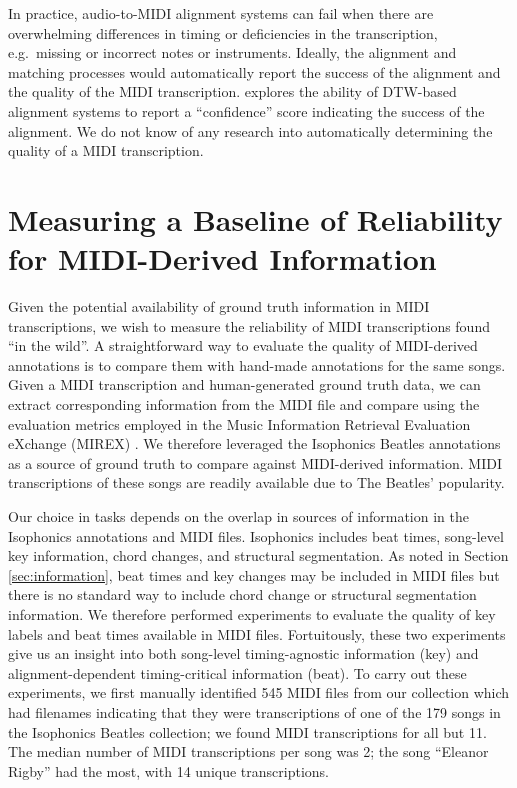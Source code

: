 \documentclass{article}
\begin{document}
In practice, audio-to-MIDI alignment systems can fail when there are overwhelming differences in timing or deficiencies in the transcription, e.g.\ missing or incorrect notes or instruments.
Ideally, the alignment and matching processes would automatically report the success of the alignment and the quality of the MIDI transcription.
\cite{raffel2016optimizing} explores the ability of DTW-based alignment systems to report a ``confidence'' score indicating the success of the alignment.
We do not know of any research into automatically determining the quality of a MIDI transcription.


\section{Measuring a Baseline of Reliability for MIDI-Derived Information}
\label{sec:measuring}

Given the potential availability of ground truth information in MIDI transcriptions, we wish to measure the reliability of MIDI transcriptions found ``in the wild''.
A straightforward way to evaluate the quality of MIDI-derived annotations is to compare them with hand-made annotations for the same songs.
Given a MIDI transcription and human-generated ground truth data, we can extract corresponding information from the MIDI file and compare using the evaluation metrics employed in the Music Information Retrieval Evaluation eXchange (MIREX) \cite{downie2008music}.
We therefore leveraged the Isophonics Beatles annotations \cite{mauch2009omras2} as a source of ground truth to compare against MIDI-derived information.  MIDI transcriptions of these songs are readily available due to The Beatles' popularity.

Our choice in tasks depends on the overlap in sources of information in the Isophonics annotations and MIDI files.
Isophonics includes beat times, song-level key information, chord changes, and structural segmentation.
As noted in Section \ref{sec:information}, beat times and key changes may be included in MIDI files but there is no standard way to include chord change or structural segmentation information.
We therefore performed experiments to evaluate the quality of key labels and beat times available in MIDI files.
Fortuitously, these two experiments give us an insight into both song-level timing-agnostic information (key) and alignment-dependent timing-critical information (beat).
To carry out these experiments, we first manually identified 545 MIDI files from our collection which had filenames indicating that they were transcriptions of one of the 179 songs in the Isophonics Beatles collection; we found MIDI transcriptions for all but 11.
The median number of MIDI transcriptions per song was 2; the song ``Eleanor Rigby'' had the most, with 14 unique transcriptions.
\end{document}
